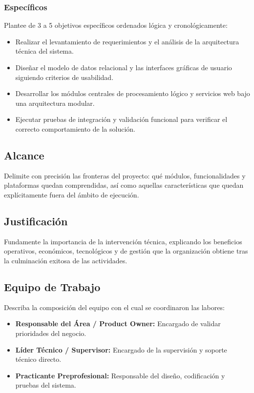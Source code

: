 \subsubsection{Específicos}
Plantee de 3 a 5 objetivos específicos ordenados lógica y cronológicamente:
\begin{itemize}
  \item Realizar el levantamiento de requerimientos y el análisis de la arquitectura técnica del sistema.
  \item Diseñar el modelo de datos relacional y las interfaces gráficas de usuario siguiendo criterios de usabilidad.
  \item Desarrollar los módulos centrales de procesamiento lógico y servicios web bajo una arquitectura modular.
  \item Ejecutar pruebas de integración y validación funcional para verificar el correcto comportamiento de la solución.
\end{itemize}

\subsection{Alcance}
Delimite con precisión las fronteras del proyecto: qué módulos, funcionalidades y plataformas quedan comprendidas, así como aquellas características que quedan explícitamente fuera del ámbito de ejecución.

\subsection{Justificación}
Fundamente la importancia de la intervención técnica, explicando los beneficios operativos, económicos, tecnológicos y de gestión que la organización obtiene tras la culminación exitosa de las actividades.

\subsection{Equipo de Trabajo}
Describa la composición del equipo con el cual se coordinaron las labores:
\begin{itemize}
  \item \textbf{Responsable del Área / Product Owner:} Encargado de validar prioridades del negocio.
  \item \textbf{Líder Técnico / Supervisor:} Encargado de la supervisión y soporte técnico directo.
  \item \textbf{Practicante Preprofesional:} Responsable del diseño, codificación y pruebas del sistema.
\end{itemize}

